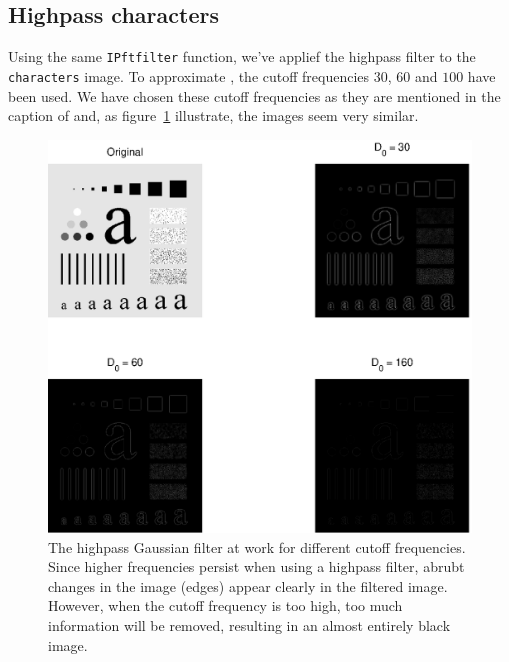 \subsection{Highpass characters}
Using the same \texttt{IPftfilter} function, we've applief the highpass filter to the \texttt{characters} image.
To approximate \cite[Figure~4.56]{gonzalez2002digital}, the cutoff frequencies \(30\), \(60\) and \(100\) have been used. We have chosen these cutoff frequencies as they are mentioned in the caption of \cite[Figure~4.56]{gonzalez2002digital} and, as figure~\ref{fig:highChars} illustrate, the images seem very similar.
\begin{figure}[ht]
 \centering
 \includegraphics[width=\linewidth]{characters_high_pass.eps}
 \caption{
 	The highpass Gaussian filter at work for different cutoff frequencies.
 	Since higher frequencies persist when using a highpass filter, abrubt changes in the image (edges) appear clearly in the filtered image.
 	However, when the cutoff frequency is too high, too much information will be removed, resulting in an almost entirely black image.
 }
 \label{fig:highChars}
\end{figure}

\clearpage